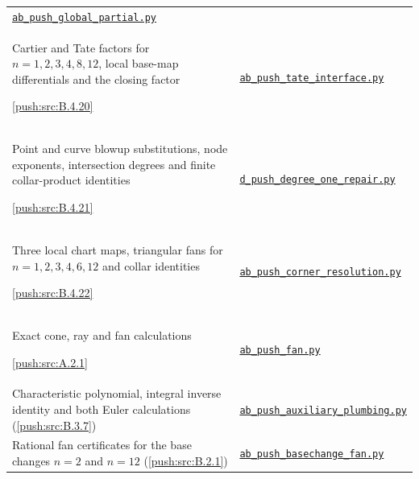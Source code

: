 {\begin{longtable}{@{}>{\raggedright\arraybackslash}p{}>{\raggedright\arraybackslash}p{}@{}}
\href{https://raw.githubusercontent.com/KokunoYumeto/s6-complex-structure-workbench/\SsixRepositoryCommit/pro_returns/S6_02_PUSH_final_20261115T2217Z/S6_02_PUSH/code/ab_push_global_partial.py}{\nolinkurl{ab_push_global_partial.py}} \\[3pt]
Cartier and Tate factors for $n=1,2,3,4,8,12$, local base-map differentials and the closing factor\par \cref{push:src:B.4.20} &
\href{https://raw.githubusercontent.com/KokunoYumeto/s6-complex-structure-workbench/\SsixRepositoryCommit/pro_returns/S6_02_PUSH_final_20261115T2217Z/S6_02_PUSH/code/ab_push_tate_interface.py}{\nolinkurl{ab_push_tate_interface.py}} \\[3pt]
Point and curve blowup substitutions, node exponents, intersection degrees and finite collar-product identities\par \cref{push:src:B.4.21} &
\href{https://raw.githubusercontent.com/KokunoYumeto/s6-complex-structure-workbench/\SsixRepositoryCommit/pro_returns/S6_02_PUSH_final_20261115T2217Z/S6_02_PUSH/code/d_push_degree_one_repair.py}{\nolinkurl{d_push_degree_one_repair.py}} \\[3pt]
Three local chart maps, triangular fans for $n=1,2,3,4,6,12$ and collar identities\par \cref{push:src:B.4.22} &
\href{https://raw.githubusercontent.com/KokunoYumeto/s6-complex-structure-workbench/\SsixRepositoryCommit/pro_returns/S6_02_PUSH_final_20261115T2217Z/S6_02_PUSH/code/ab_push_corner_resolution.py}{\nolinkurl{ab_push_corner_resolution.py}} \\[3pt]
Exact cone, ray and fan calculations\par \cref{push:src:A.2.1} &
\href{https://raw.githubusercontent.com/KokunoYumeto/s6-complex-structure-workbench/\SsixRepositoryCommit/pro_returns/S6_10_PAPERS_checkpoint_15_20261119T1045Z/S6_10_PAPERS/code/I/replay_family_applications/ab_push_fan.py}{\nolinkurl{ab_push_fan.py}} \\[3pt]
Characteristic polynomial, integral inverse identity and both Euler calculations (\cref{push:src:B.3.7}) & \href{https://raw.githubusercontent.com/KokunoYumeto/s6-complex-structure-workbench/\SsixRepositoryCommit/pro_returns/S6_02_PUSH_final_20261115T2217Z/S6_02_PUSH/code/ab_push_auxiliary_plumbing.py}{\texttt{ab\_push\_auxiliary\_plumbing.py}} \\
Rational fan certificates for the base changes $n=2$ and $n=12$ (\cref{push:src:B.2.1}) & \href{https://raw.githubusercontent.com/KokunoYumeto/s6-complex-structure-workbench/\SsixRepositoryCommit/pro_returns/S6_02_PUSH_final_20261115T2217Z/S6_02_PUSH/code/ab_push_basechange_fan.py}{\texttt{ab\_push\_basechange\_fan.py}} \\

\end{longtable}}
